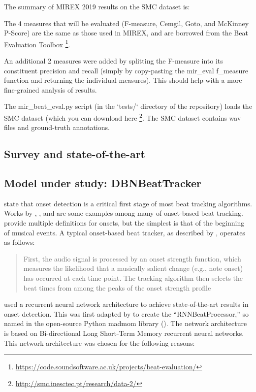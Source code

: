 \documentclass[letter,12pt,notitlepage]{article}
\begin{document}
The summary of MIREX 2019 results on the SMC dataset is:

The 4 measures that will be evaluated (F-measure, Cemgil, Goto, and McKinney P-Score) are the same as those used in MIREX, and are borrowed from the Beat Evaluation Toolbox \footnote{\href{https://code.soundsoftware.ac.uk/projects/beat-evaluation/}{https://code.soundsoftware.ac.uk/projects/beat-evaluation/}}.

An additional 2 measures were added by splitting the F-measure into its constituent precision and recall (simply by copy-pasting the mir\_eval f\_measure function and returning the individual measures). This should help with a more fine-grained analysis of results.

The mir\_beat\_eval.py script (in the `tests/` directory of the repository) loads the SMC dataset (which you can download here \footnote{\href{http://smc.inesctec.pt/research/data-2/}{http://smc.inesctec.pt/research/data-2/}}. The SMC dataset contains wav files and ground-truth annotations.

\subsection{Survey and state-of-the-art}

\subsection{Model under study: DBNBeatTracker}

\textcite{mcfee} state that onset detection is a critical first stage of most beat tracking algorithms. Works by \textcite{goto}, \textcite{ellis}, and \textcite{btrack} are some examples among many of onset-based beat tracking. \textcite{onsets} provide multiple definitions for onsets, but the simplest is that of the beginning of musical events. A typical onset-based beat tracker, as described by \textcite{mcfee}, operates as follows:
\begin{quote}
	\vspace{-0.25em}
	First, the audio signal is processed by an onset strength function, which measures the likelihood that a musically salient change (e.g., note onset) has occurred at each time point. The tracking algorithm then selects the beat times from among the peaks of the onset strength profile
\end{quote}

\textcite{rnnonset} used a recurrent neural network architecture to achieve state-of-the-art results in onset detection. This was first adapted by \textcite{bock1} to create the ``RNNBeatProcessor,'' so named in the open-source Python madmom library (\cite{madmom}). The network architecture is based on Bi-directional Long Short-Term Memory recurrent neural networks. This network architecture was chosen for the following reasons:
\end{document}
